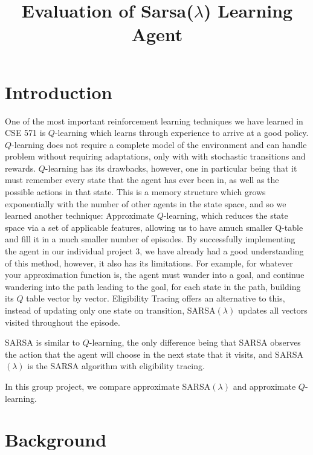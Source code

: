 \documentclass[10pt,conference]{IEEEtran}
\title{
	Evaluation of Sarsa(\(\lambda\)) Learning Agent 
	}
\author{
	\IEEEauthorblockN{Padraic Cashin \IEEEauthorrefmark{1}, 
	        Ruihao Zhou \IEEEauthorrefmark{2}
		David Lahtinen \IEEEauthorrefmark{3}, 
		Zubin Kapadia \IEEEauthorrefmark{4},
	}
	\IEEEauthorblockA{
		\IEEEauthorrefmark{1} ASU ID: 1214153888 \\
		\IEEEauthorrefmark{2} ASU ID: 1213439264 \\
		\IEEEauthorrefmark{3} ASU ID: 1207725034 \\
		\IEEEauthorrefmark{4} ASU ID: 1213238024 \\
	}
}
\begin{document}
\maketitle

\section{Introduction}

One of the most important reinforcement learning techniques we have learned in CSE 571 is 
\(Q\)-learning which learns through experience to arrive at a good policy.
\(Q\)-learning does not require a complete model of the environment and 
can handle problem without requiring adaptations, only with with stochastic 
transitions and rewards. \(Q\)-learning has its drawbacks, however, one in particular being that
it must remember every state that the agent has ever been in, as well as the possible actions in that
state. This is a memory structure which grows exponentially with the number of other agents in the state space,
and so we learned another technique: Approximate \(Q\)-learning, 
which reduces the state space via a set of applicable features,
allowing us to have amuch smaller Q-table and fill it in a much smaller number of episodes.
By successfully implementing the agent in our individual project 
3, we have already had a good understanding of this method, however, it also has its limitations.
For example, for whatever your approximation function is, the agent must wander into a goal, and continue wandering
into the path leading to the goal, for each state in the path, building its \(Q\) table vector by vector.
Eligibility Tracing offers an alternative to this, instead of updating only one state on transition,
SARSA\((\lambda)\) updates all vectors visited throughout the episode.

SARSA is similar to \(Q\)-learning, the only difference being that SARSA observes the action that the agent will choose
in the next state that it visits, and SARSA\((\lambda)\) is the SARSA algorithm with eligibility tracing.

In this group project, we compare approximate SARSA\((\lambda)\) and approximate \(Q\)-learning.

\label{sec:intro}

\section{Background}
\label{sec:background}
	
\end{document}
